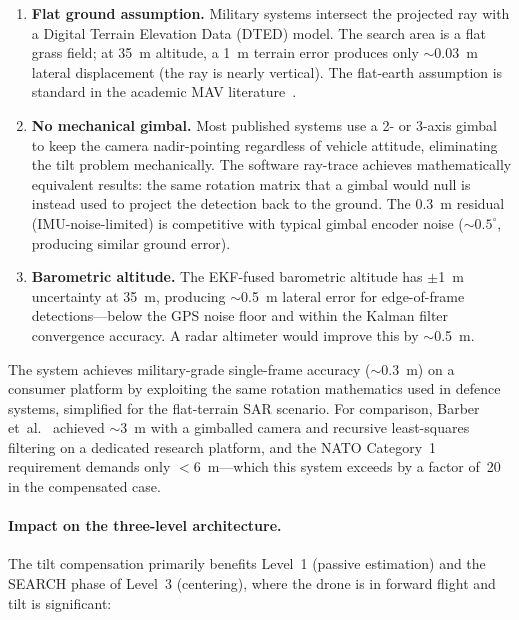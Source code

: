 \begin{enumerate}
  \item \textbf{Flat ground assumption.}  Military systems intersect the projected ray with a Digital Terrain Elevation Data (DTED) model.  The search area is a flat grass field; at \SI{35}{\metre} altitude, a \SI{1}{\metre} terrain error produces only $\sim$\SI{0.03}{\metre} lateral displacement (the ray is nearly vertical).  The flat-earth assumption is standard in the academic MAV literature~\cite{barber2006vision,beard2012small}.

  \item \textbf{No mechanical gimbal.}  Most published systems use a 2- or 3-axis gimbal to keep the camera nadir-pointing regardless of vehicle attitude, eliminating the tilt problem mechanically.  The software ray-trace achieves mathematically equivalent results: the same rotation matrix that a gimbal would null is instead used to project the detection back to the ground.  The \SI{0.3}{\metre} residual (IMU-noise-limited) is competitive with typical gimbal encoder noise ($\sim 0.5^{\circ}$, producing similar ground error).

  \item \textbf{Barometric altitude.}  The EKF-fused barometric altitude has $\pm$\SI{1}{\metre} uncertainty at \SI{35}{\metre}, producing $\sim$\SI{0.5}{\metre} lateral error for edge-of-frame detections---below the GPS noise floor and within the Kalman filter convergence accuracy.  A radar altimeter would improve this by $\sim$\SI{0.5}{\metre}.
\end{enumerate}

\noindent The system achieves military-grade single-frame accuracy ($\sim$\SI{0.3}{\metre}) on a  consumer platform by exploiting the same rotation mathematics used in defence systems, simplified for the flat-terrain SAR scenario.  For comparison, Barber et~al.~\cite{barber2006vision} achieved $\sim$\SI{3}{\metre} with a gimballed camera and recursive least-squares filtering on a dedicated research platform, and the NATO Category~1 requirement demands only $<$\SI{6}{\metre}---which this system exceeds by a factor of~20 in the compensated case.

\paragraph{Impact on the three-level architecture.}
The tilt compensation primarily benefits Level~1 (passive estimation) and the SEARCH phase of Level~3 (centering), where the drone is in forward flight and tilt is significant:

